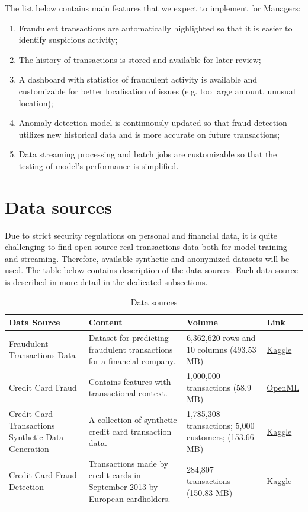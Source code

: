 \documentclass[12pt,a4paper, hidelinks]{article}
\begin{document}
The list below contains main features that we expect to implement for Managers:
\begin{enumerate}
    \item Fraudulent transactions are automatically highlighted so that it is easier to identify suspicious activity;
    \item The history of transactions is stored and available for later review;
    \item A dashboard with statistics of fraudulent activity is available and customizable for better localisation of issues (e.g. too large amount, unusual location);
    \item Anomaly-detection model is continuously updated so that fraud detection utilizes new historical data and is more accurate on future transactions;
    \item Data streaming processing and batch jobs are customizable so that the testing of model's performance is simplified.
\end{enumerate}


\newpage

\section{Data sources}

Due to strict security regulations on personal and financial data, it is quite challenging to find open source real transactions data both for model training and streaming. Therefore, available synthetic and anonymized datasets will be used. The table below contains description of the data sources. Each data source is described in more detail in the dedicated subsections.

\begin{table}[h!]
\centering
\begin{tabular}{|p{5cm}|p{6cm}|p{3cm}|p{1.5cm}|}
\hline
\textbf{Data Source} & \textbf{Content} & \textbf{Volume} & \textbf{Link} \\
\hline
Fraudulent Transactions Data &  Dataset for predicting fraudulent transactions for a financial company. &  6,362,620 rows and 10 columns (493.53 MB) & \href{https://www.kaggle.com/datasets/chitwanmanchanda/fraudulent-transactions-data}{Kaggle} \\
\hline
Credit Card Fraud & Contains features with transactional context. & 1,000,000 transactions (58.9 MB) & \href{https://www.openml.org/search?type=data&status=active&id=45955}{OpenML} \\
\hline
Credit Card Transactions Synthetic Data Generation & A collection of synthetic credit card transaction data. & 1,785,308 transactions; 5,000 customers; (153.66 MB) & \href{https://www.kaggle.com/datasets/cgrodrigues/credit-card-transactions-synthetic-data-generation?select=transactions_df.csv}{Kaggle} \\
\hline
Credit Card Fraud Detection & Transactions made by credit cards in September 2013 by European cardholders. & 284,807 transactions (150.83 MB) & \href{https://www.kaggle.com/datasets/mlg-ulb/creditcardfraud}{Kaggle} \\
\hline
\end{tabular}
\caption{Data sources}
\end{table}
\end{document}

